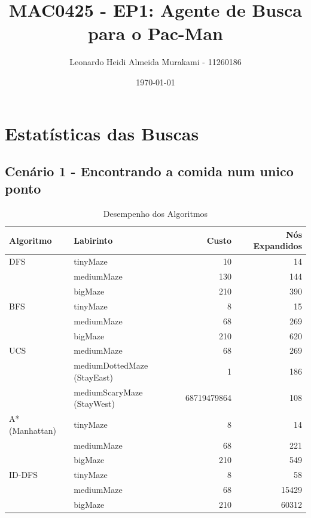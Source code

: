 \documentclass[a4paper,11pt]{article}
\title{MAC0425 - EP1: Agente de Busca para o Pac-Man}
\author{Leonardo Heidi Almeida Murakami - 11260186}
\date{\today}
\begin{document}
\maketitle

\section{Estatísticas das Buscas}

\subsection{Cenário 1 - Encontrando a comida num unico ponto}

\begin{table}[h]
\centering
\caption{Desempenho dos Algoritmos}
\begin{tabular}{llrr}
\toprule
\textbf{Algoritmo} & \textbf{Labirinto} & \textbf{Custo} & \textbf{Nós Expandidos} \\
\midrule
DFS & tinyMaze & 10 & 14 \\
    & mediumMaze & 130 & 144 \\
    & bigMaze & 210 & 390 \\
\midrule
BFS & tinyMaze & 8 & 15 \\
    & mediumMaze & 68 & 269 \\
    & bigMaze & 210 & 620 \\
\midrule
UCS & mediumMaze & 68 & 269 \\
    & mediumDottedMaze (StayEast) & 1 & 186 \\
    & mediumScaryMaze (StayWest) & 68719479864 & 108 \\
\midrule
A* (Manhattan) & tinyMaze & 8 & 14 \\
               & mediumMaze & 68 & 221 \\
               & bigMaze & 210 & 549 \\
\midrule
ID-DFS & tinyMaze & 8 & 58 \\
       & mediumMaze & 68 & 15429 \\
       & bigMaze & 210 & 60312 \\
\bottomrule
\end{tabular}
\end{table}
\end{document}
